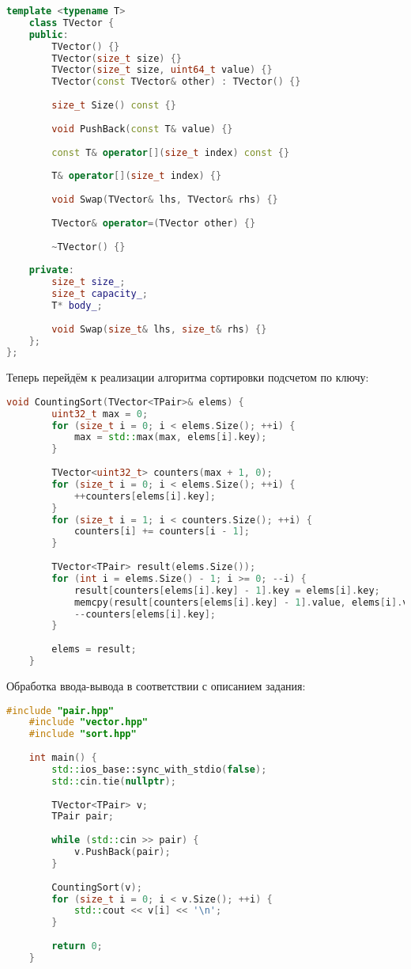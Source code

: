 \begin{lstlisting}[language=C++]
    template <typename T> 
    class TVector {
    public:
        TVector() {}
        TVector(size_t size) {}
        TVector(size_t size, uint64_t value) {}
        TVector(const TVector& other) : TVector() {}
        
        size_t Size() const {}
    
        void PushBack(const T& value) {}
    
        const T& operator[](size_t index) const {}
    
        T& operator[](size_t index) {}
    
        void Swap(TVector& lhs, TVector& rhs) {}
    
        TVector& operator=(TVector other) {}
    
        ~TVector() {}
    
    private:
        size_t size_;
        size_t capacity_;
        T* body_;
    
        void Swap(size_t& lhs, size_t& rhs) {}
    };
};
\end{lstlisting}

\newpage Теперь перейдём к реализации алгоритма сортировки подсчетом по ключу:

\begin{lstlisting}[language=C++]
    void CountingSort(TVector<TPair>& elems) {
        uint32_t max = 0;
        for (size_t i = 0; i < elems.Size(); ++i) {
            max = std::max(max, elems[i].key);
        }
        
        TVector<uint32_t> counters(max + 1, 0);
        for (size_t i = 0; i < elems.Size(); ++i) {
            ++counters[elems[i].key];
        }
        for (size_t i = 1; i < counters.Size(); ++i) {
            counters[i] += counters[i - 1];
        }
       
        TVector<TPair> result(elems.Size());
        for (int i = elems.Size() - 1; i >= 0; --i) {
            result[counters[elems[i].key] - 1].key = elems[i].key;
            memcpy(result[counters[elems[i].key] - 1].value, elems[i].value, sizeof(elems[i].value));
            --counters[elems[i].key];
        }
    
        elems = result;
    }
\end{lstlisting}

Обработка ввода-вывода в соответствии с описанием задания:

\begin{lstlisting}[language=C++]
    #include "pair.hpp"
    #include "vector.hpp"
    #include "sort.hpp"
    
    int main() {
        std::ios_base::sync_with_stdio(false);
        std::cin.tie(nullptr);
    
        TVector<TPair> v;
        TPair pair;
    
        while (std::cin >> pair) {
            v.PushBack(pair);
        }
    
        CountingSort(v);
        for (size_t i = 0; i < v.Size(); ++i) {
            std::cout << v[i] << '\n';
        }
    
        return 0;
    }
\end{lstlisting}

